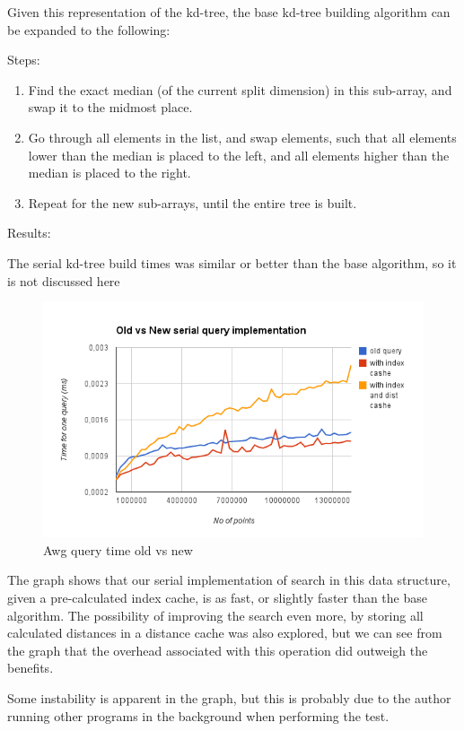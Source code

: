 Given this representation of the kd-tree, the base kd-tree building algorithm can be expanded to the following:

Steps:
\begin{enumerate}
    \item Find the exact median (of the current split dimension) in this sub-array, and swap it to the midmost place.
    \item Go through all elements in the list, and swap elements, such that all elements lower than the median is placed to the left, and all elements higher than the median is placed to the right.
    \item Repeat for the new sub-arrays, until the entire tree is built.
\end{enumerate}

Results:

The serial kd-tree build times was similar or better than the base algorithm, so it is not discussed here

\begin{figure}[ht!]
\centering
\includegraphics[width=120mm]{../gfx/awg-query-time-old-vs-new.png}

\caption{Awg query time old vs new}
\label{fig:awg_query_time_old_vs_new}
\end{figure}

The graph shows that our serial implementation of search in this data structure, given a pre-calculated index cache, is as fast, or slightly faster than the base algorithm. The possibility of improving the search even more, by storing all calculated distances in a distance cache was also explored, but we can see from the graph that the overhead associated with this operation did outweigh the benefits.

Some instability is apparent in the graph, but this is probably due to the author running other programs in the background when performing the test.

